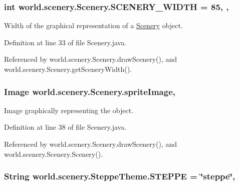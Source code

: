 \hypertarget{a00024_affb047c028883c6d069a03ef0f1caeb8}{
\subsubsection[{S\-C\-E\-N\-E\-R\-Y\-\_\-\-W\-I\-D\-T\-H}]{\setlength{\rightskip}{0pt plus 5cm}int world.\-scenery.\-Scenery.\-S\-C\-E\-N\-E\-R\-Y\-\_\-\-W\-I\-D\-T\-H = 85\hspace{0.3cm}{\ttfamily [static]}, {\ttfamily [protected]}, {\ttfamily [inherited]}}}\label{a00024_affb047c028883c6d069a03ef0f1caeb8}


Width of the graphical representation of a \hyperlink{a00024}{Scenery} object. 



Definition at line 33 of file Scenery.\-java.



Referenced by world.\-scenery.\-Scenery.\-draw\-Scenery(), and world.\-scenery.\-Scenery.\-get\-Scenery\-Width().

\hypertarget{a00024_a512d9c0a154e6843389e343d80843326}{
\subsubsection[{sprite\-Image}]{\setlength{\rightskip}{0pt plus 5cm}Image world.\-scenery.\-Scenery.\-sprite\-Image\hspace{0.3cm}{\ttfamily [protected]}, {\ttfamily [inherited]}}}\label{a00024_a512d9c0a154e6843389e343d80843326}


Image graphically representing the object. 



Definition at line 38 of file Scenery.\-java.



Referenced by world.\-scenery.\-Scenery.\-draw\-Scenery(), and world.\-scenery.\-Scenery.\-Scenery().

\hypertarget{a00027_a03bdfdc54a3a5d52694b77342ec34e3e}{
\subsubsection[{S\-T\-E\-P\-P\-E}]{\setlength{\rightskip}{0pt plus 5cm}String world.\-scenery.\-Steppe\-Theme.\-S\-T\-E\-P\-P\-E = \char`\"{}steppe\char`\"{}\hspace{0.3cm}{\ttfamily [static]}, {\ttfamily [inherited]}}}\label{a00027_a03bdfdc54a3a5d52694b77342ec34e3e}


